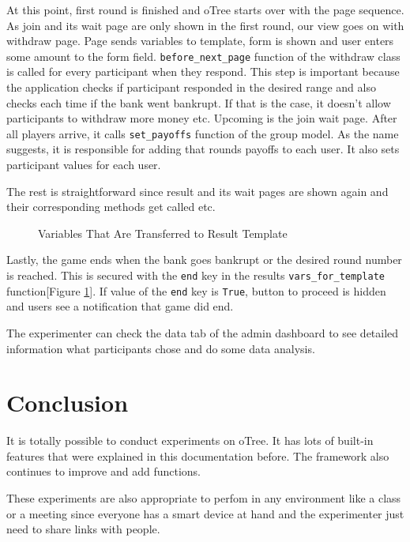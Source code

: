 At this point, first round is finished and oTree starts over with the page sequence. As join and its wait page are only shown in the first round, our view goes on with withdraw page. Page sends variables to template, form is shown and user enters some amount to the form field. \verb|before_next_page| function of the withdraw class is called for every participant when they respond. This step is important because the application checks if participant responded in the desired range and also checks each time if the bank went bankrupt. If that is the case, it doesn't allow participants to withdraw more money etc. Upcoming is the join wait page. After all players arrive, it calls \verb|set_payoffs| function of the group model. As the name suggests, it is responsible for adding that rounds payoffs to each user. It also sets participant values for each user.

The rest is straightforward since result and its wait pages are shown again and their corresponding methods get called etc. 

\begin{figure}[h]
	\centerline{}
	\caption{Variables That Are Transferred to Result Template  }
	\label{fig:picture16}
\end{figure}

Lastly, the game ends when the bank goes bankrupt or the desired round number is reached. This is secured with the \verb|end| key in the results \verb|vars_for_template| function[Figure \ref{fig:picture16}]. If value of the \verb|end| key is \verb|True|, button to proceed is hidden and users see a notification that game did end.

The experimenter can check the data tab of the admin dashboard to see detailed information what participants chose and do some data analysis.

\chapter{Conclusion}

It is totally possible to conduct experiments on oTree. It has lots of built-in features that were explained in this documentation before. The framework also continues to improve and add functions. 

These experiments are also appropriate to perfom in any environment like a class or a meeting since everyone has a smart device at hand and the experimenter just need to share links with people.

